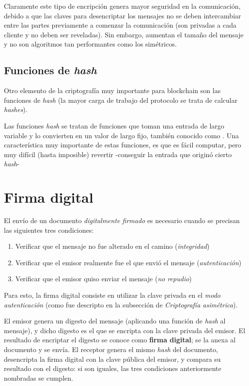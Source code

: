 Claramente este tipo de encripción genera mayor seguridad en la comunicación, debido a que las claves para desencriptar los mensajes no se deben intercambiar entre las partes previamente a comenzar la comunicación (son privadas a cada cliente y no deben ser reveladas). Sin embargo, aumentan el tamaño del mensaje y no son algoritmos tan performantes como los simétricos.

\subsection{Funciones de \emph{hash}}

Otro elemento de la criptografía muy importante para blockchain son las funciones de \emph{hash} (la mayor carga de trabajo del protocolo se trata de calcular \emph{hashes}).

Las funciones \emph{hash} se tratan de funciones que toman una entrada de largo variable y lo convierten en un valor de largo fijo, también conocido como  \autocite{VanhouvtenHashIntro}. Una característica muy importante de estas funciones, es que es fácil computar, pero muy difícil (hasta imposible) revertir -conseguir la entrada que originó cierto \emph{hash}-

\section{Firma digital}

El envío de un documento \emph{digitalmente firmado} es necesario cuando se precisan las siguientes tres condiciones:

\begin{enumerate}
    \item Verificar que el mensaje no fue alterado en el camino (\emph{integridad})
    \item Verificar que el emisor realmente fue el que envió el mensaje (\emph{autenticación})
    \item Verificar que el emisor quiso enviar el mensaje (\emph{no repudio})
\end{enumerate}

Para esto, la firma digital consiste en utilizar la clave privada en el \emph{modo autenticación} (como fue descripto en la subsección de \emph{Criptografía asimétrica}). 

El emisor genera un digesto del mensaje (aplicando una función de \emph{hash} al mensaje), y dicho digesto es el que se encripta con la clave privada del emisor. El resultado de encriptar el digesto se conoce como \textbf{firma digital}; se la anexa al documento y se envía. El receptor genera el mismo \emph{hash} del documento, desencripta la firma digital con la clave pública del emisor, y compara su resultado con el digesto: si son iguales, las tres condiciones anteriormente nombradas se cumplen.  

